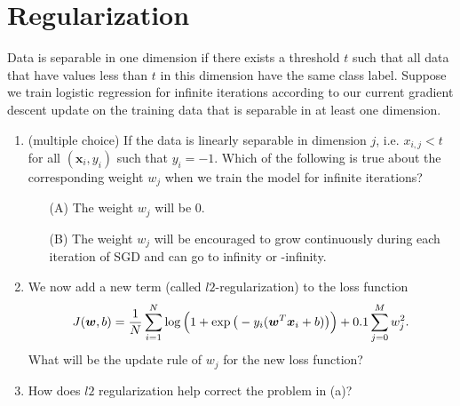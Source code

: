 \section{Regularization }
Data is separable in one dimension if there exists a threshold $t$ such that all data that have values less than $t$ in this dimension have the same class label. Suppose we train logistic regression for infinite iterations according to our current gradient descent update on the training data that is separable in at least one dimension.
\begin{enumerate}
\item {} (multiple choice) If the data is linearly separable in dimension $j$, i.e. $x_{i,j}<t$ for all $(\mathbf{x}_i,y_i)$ such that $y_i=-1$. Which of the following is true about the corresponding weight $w_j$ when we train the model for infinite iterations?

\begin{itemize}
\item[(A)] The weight $w_j$ will be 0.
\item[(B)] The weight $w_j$ will be encouraged to grow continuously during each iteration of SGD
and can go to infinity or -infinity.
\end{itemize}


\item {} We now add a new term (called $l2$-regularization) to the loss function
\begin{equation}
\label{eq:j}
J(\boldsymbol{w}, b) = 
  \frac{1}{N} \sum_{i=1}^{N}\log\Big(1+\exp\big(-y_i(\boldsymbol{w}^T \boldsymbol{x}_i+b)\big)\Big) +  0.1 \sum^M_{j=0}w_j^2.
\end{equation}
What will be the update rule of $w_j$ for the new loss function?


\item {} How does $l2$ regularization help correct the problem in (a)?


\end{enumerate}